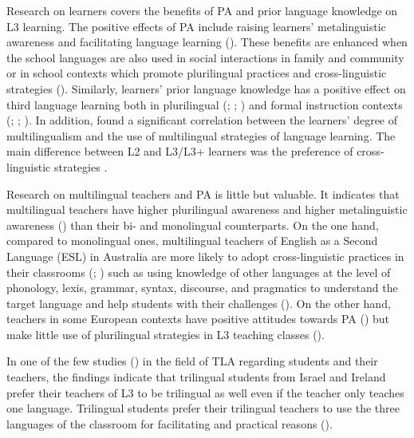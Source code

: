 \documentclass[output=paper]{../langscibook}
\begin{document}
Research on learners covers the benefits of PA and prior language knowledge on L3 learning. The positive effects of PA include raising learners’ metalinguistic awareness \citep{JessnerEtAl2016} and facilitating language learning (\citealt{BonoStratilaki2009}). These benefits are enhanced when the school languages are also used in social interactions in family and community or in school contexts which promote plurilingual practices and cross-linguistic strategies (\citealt{BonoStratilaki2009}). Similarly, learners’ prior language knowledge has a positive effect on third language learning both in plurilingual (\citealt{BonoStratilaki2009}; \citealt{Cenoz2013b}; \citealt{Sanchez2015}) and formal instruction contexts (\citealt{Kemp2001}; \citealt{GibsonHufeisen2003};  \citealt{DeAngelis2007}). In addition, \citet{Dmitrenko2017} found a significant correlation between the learners’ degree of multilingualism and the use of multilingual strategies of language learning. The main difference between L2 and L3/L3+ learners was the preference of cross-linguistic strategies \citep{Dmitrenko2017}.

Research on multilingual teachers and PA is little but valuable. It indicates that multilingual teachers have higher plurilingual awareness \citep{Otwinowska2014} and higher metalinguistic awareness (\citealt{Ellis2004,Ellis2013}) than their bi- and monolingual counterparts. On the one hand, compared to monolingual ones, multilingual teachers of English as a Second Language (ESL) in Australia are more likely to adopt cross-linguistic practices in their classrooms (\citealt{Ellis2004,Ellis2013}; \citealt{HigginsPonte2017}) such as using knowledge of other languages at the level of phonology, lexis, grammar, syntax, discourse, and pragmatics to understand the target language and help students with their challenges (\citealt{Ellis2004,Ellis2013}). On the other hand, teachers in some European contexts have positive attitudes towards PA (\citealt{GrivaEtAl2016}) but make little use of plurilingual strategies in L3 teaching classes (\citealt{GöbelVieluf2014}).

In one of the few studies (\citealt{AroninOLaoire2003}) in the field of TLA regarding students and their teachers, the findings indicate that trilingual students from Israel and Ireland prefer their teachers of L3 to be trilingual as well even if the teacher only teaches one language. Trilingual students prefer their trilingual teachers to use the three languages of the classroom for facilitating and practical reasons (\citealt{AroninOLaoire2003}).
\end{document}
